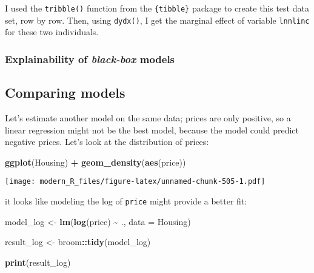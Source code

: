 \documentclass[
]{article}
\newenvironment{Shaded}{\begin{snugshade}}{\end{snugshade}}
\newcommand{\DataTypeTok}[1]{\textcolor[rgb]{0.13,0.29,0.53}{#1}}
\newcommand{\KeywordTok}[1]{\textcolor[rgb]{0.13,0.29,0.53}{\textbf{#1}}}
\newcommand{\NormalTok}[1]{#1}
\newcommand{\OperatorTok}[1]{\textcolor[rgb]{0.81,0.36,0.00}{\textbf{#1}}}
\newcommand{\StringTok}[1]{\textcolor[rgb]{0.31,0.60,0.02}{#1}}
\begin{document}
I used the \texttt{tribble()} function from the \texttt{\{tibble\}} package to create this test data set, row by row.
Then, using \texttt{dydx()}, I get the marginal effect of variable \texttt{lnnlinc} for these two individuals.

\hypertarget{explainability-of-black-box-models}{%
\subsubsection{\texorpdfstring{Explainability of \emph{black-box} models}{Explainability of black-box models}}\label{explainability-of-black-box-models}}

\hypertarget{comparing-models}{%
\subsection{Comparing models}\label{comparing-models}}

Let's estimate another model on the same data; prices are only positive, so a linear regression
might not be the best model, because the model could predict negative prices. Let's look at the
distribution of prices:

\begin{Shaded}
\begin{Highlighting}[]
\KeywordTok{ggplot}\NormalTok{(Housing) }\OperatorTok{+}
\StringTok{  }\KeywordTok{geom\_density}\NormalTok{(}\KeywordTok{aes}\NormalTok{(price))}
\end{Highlighting}
\end{Shaded}

\texttt{[image: modern\_R\_files/figure-latex/unnamed-chunk-505-1.pdf]}

it looks like modeling the log of \texttt{price} might provide a better fit:

\begin{Shaded}
\begin{Highlighting}[]
\NormalTok{model\_log \textless{}{-}}\StringTok{ }\KeywordTok{lm}\NormalTok{(}\KeywordTok{log}\NormalTok{(price) }\OperatorTok{\textasciitilde{}}\StringTok{ }\NormalTok{., }\DataTypeTok{data =}\NormalTok{ Housing)}

\NormalTok{result\_log \textless{}{-}}\StringTok{ }\NormalTok{broom}\OperatorTok{::}\KeywordTok{tidy}\NormalTok{(model\_log)}

\KeywordTok{print}\NormalTok{(result\_log)}
\end{Highlighting}
\end{Shaded}
\end{document}
